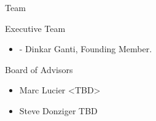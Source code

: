 \documentclass[10pt,xcolor={dvipsnames}]{beamer}
\begin{document}
\begin{frame} {Team}
  \begin{block} {Executive Team}
  \begin{itemize}
      \item - Dinkar Ganti, Founding Member.
  \end{itemize}
  \end{block}
  \begin{block} {Board of Advisors}
    \begin{itemize}
      \item Marc Lucier <TBD>
      \item Steve Donziger TBD
    \end{itemize}
  \end{block}
\end{frame}


{\1
  \begin{frame}
  \end{frame}
}
\end{document}
